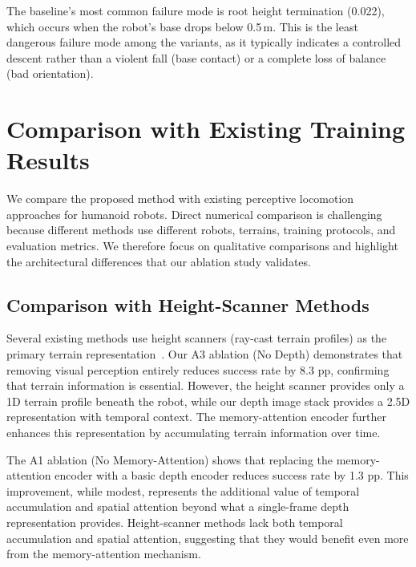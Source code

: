 The baseline's most common failure mode is root height termination (0.022), which occurs when the robot's base drops below 0.5\,m. This is the least dangerous failure mode among the variants, as it typically indicates a controlled descent rather than a violent fall (base contact) or a complete loss of balance (bad orientation).

\section{Comparison with Existing Training Results}
\label{sec:comparison_existing}

We compare the proposed method with existing perceptive locomotion approaches for humanoid robots. Direct numerical comparison is challenging because different methods use different robots, terrains, training protocols, and evaluation metrics. We therefore focus on qualitative comparisons and highlight the architectural differences that our ablation study validates.

\subsection{Comparison with Height-Scanner Methods}

Several existing methods use height scanners (ray-cast terrain profiles) as the primary terrain representation~\cite{zhang2024rpl,cheng2024extremeparkour}. Our A3 ablation (No Depth) demonstrates that removing visual perception entirely reduces success rate by 8.3 pp, confirming that terrain information is essential. However, the height scanner provides only a 1D terrain profile beneath the robot, while our depth image stack provides a 2.5D representation with temporal context. The memory-attention encoder further enhances this representation by accumulating terrain information over time.

The A1 ablation (No Memory-Attention) shows that replacing the memory-attention encoder with a basic depth encoder reduces success rate by 1.3 pp. This improvement, while modest, represents the additional value of temporal accumulation and spatial attention beyond what a single-frame depth representation provides. Height-scanner methods lack both temporal accumulation and spatial attention, suggesting that they would benefit even more from the memory-attention mechanism.


